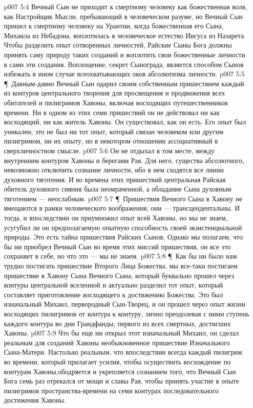 \vs p007 5:4 Вечный Сын не приходит к смертному человеку как божественная воля, как Настройщик Мысли, пребывающий в человеческом разуме, но Вечный Сын пришел к смертному человеку на Урантии, когда божественная  его Сына, Михаила из Небадона, воплотилась в человеческое естество Иисуса из Назарета. Чтобы разделить опыт сотворенных личностей, Райские Сыны Бога должны принять саму природу таких созданий и воплотить свои божественные личности в сами эти создания. Воплощение, секрет Сынограда, является способом Сынов избежать в ином случае всеохватывающих оков абсолютизма личности.
\vs p007 5:5 \P\ Давным\hyp{}давно Вечный Сын одарил своим собственным пришествием каждый из контуров центрального творения для просвещения и продвижения всех обитателей и пилигримов Хавоны, включая восходящих путешественников времени. Ни в одном из этих семи пришествий он не действовал ни как восходящий, ни как житель Хавоны. Он существовал, как он есть. Его опыт был уникален; это не был ни тот опыт, который связан  человеком или другим пилигримом, ни  их опыту, но в некотором отношении ассоциативный в сверхличностном смысле.
\vs p007 5:6 Он не отдыхал в том месте, между внутренним контуром Хавоны и берегами Рая. Для него, существа абсолютного, невозможно отключить сознание личности, ибо в нем сходятся все линии духовного тяготения. И во времена этих пришествий центральная Райская обитель духовного сияния была неомраченной, а обладание Сына духовным тяготением --- неослабным.
\vs p007 5:7 \P\ Пришествия Вечного Сына в Хавону не вмещаются в рамки человеческого воображения; они --- трансцендентальны. И тогда, и впоследствии он приумножил опыт всей Хавоны, но мы не знаем, усугубил ли он предполагаемую опытную способность своей экзистенциальной природы. Это есть тайна пришествия Райских Сынов. Однако мы полагаем, что бы ни приобрел Вечный Сын во время этих миссий пришествия, он все это сохраняет в себе, но что это --- мы не знаем.
\vs p007 5:8 \P\ Как бы ни было нам трудно постигать пришествие Второго Лица Божества, мы все\hyp{}таки постигаем пришествие в Хавону Сына Вечного Сына, который буквально прошел через контуры центральной вселенной и актуально разделил тот опыт, который составляет приготовление восходящего к достижению Божества. Это был изначальный Михаил, первородный Сын\hyp{}Творец, и он прошел через опыт жизни восходящих пилигримов от контура к контуру, лично преодолевая с ними ступень каждого контура во дни Грандфанды, первого из всех смертных, достигших Хавоны.
\vs p007 5:9 Что бы еще ни открыл этот изначальный Михаил, он сделал реальным для созданий Хавоны необыкновенное пришествие Изначального Сына\hyp{}Матери. Настолько реальным, что впоследствии всегда каждый пилигрим во времени, который прилагает усилия, чтобы осуществить восхождение по контурам Хавоны,ободряется и укрепляется сознанием того, что Вечный Сын Бога семь раз отрекался от мощи и славы Рая, чтобы принять участие в опыте пилигримов пространства\hyp{}времени на семи контурах последовательного достижения Хавоны.
